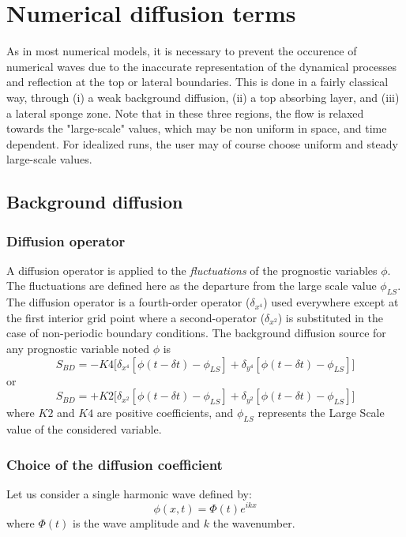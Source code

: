 
\chapter{Numerical diffusion terms}
\minitoc


As in most numerical models, it is necessary to prevent the occurence of
numerical waves due to the inaccurate representation of the dynamical
processes and reflection at the top or lateral boundaries. This is done
in a fairly classical way, through (i) a weak background diffusion, (ii) a
top absorbing layer, and (iii) a lateral sponge zone. Note that in these
three regions, the flow is relaxed towards the "large-scale" values, which
may be non uniform in space, and time dependent. For idealized runs, the
user may of course choose uniform and steady large-scale values.

\section{Background diffusion}
\subsection{Diffusion operator}
A diffusion operator is applied to the {\em fluctuations} of the prognostic
variables $\phi$. The fluctuations are defined here as the departure
from the large scale value $\phi_{LS}$.
The diffusion operator is a fourth-order operator
($\delta_{x^4}$) used everywhere except at the first interior grid point where
a second-operator ($\delta_{x^2}$) is substituted in the case of non-periodic
boundary conditions.
The background diffusion source for any prognostic variable noted $\phi$
is
$$
S_{BD}=-K4 \big[ \delta_{x^4}[\phi(t-\delta t)- \phi_{LS}]+
\delta_{y^4}[\phi(t-\delta t)- \phi_{LS}]\big]
$$
or
$$
S_{BD}=+K2 \big[ \delta_{x^2}[\phi(t-\delta t)- \phi_{LS}]+
\delta_{y^2}[\phi(t-\delta t)- \phi_{LS}]\big]
$$
where $K2$ and $K4$ are positive coefficients, and $\phi_{LS}$ represents the
Large Scale value of the considered variable.


\subsection{Choice of the diffusion coefficient}
Let us consider a single harmonic wave defined by:
$$ \phi(x,t)=\Phi(t)e^{ikx}$$
where $\Phi(t)$ is the wave amplitude and $k$ the wavenumber.

